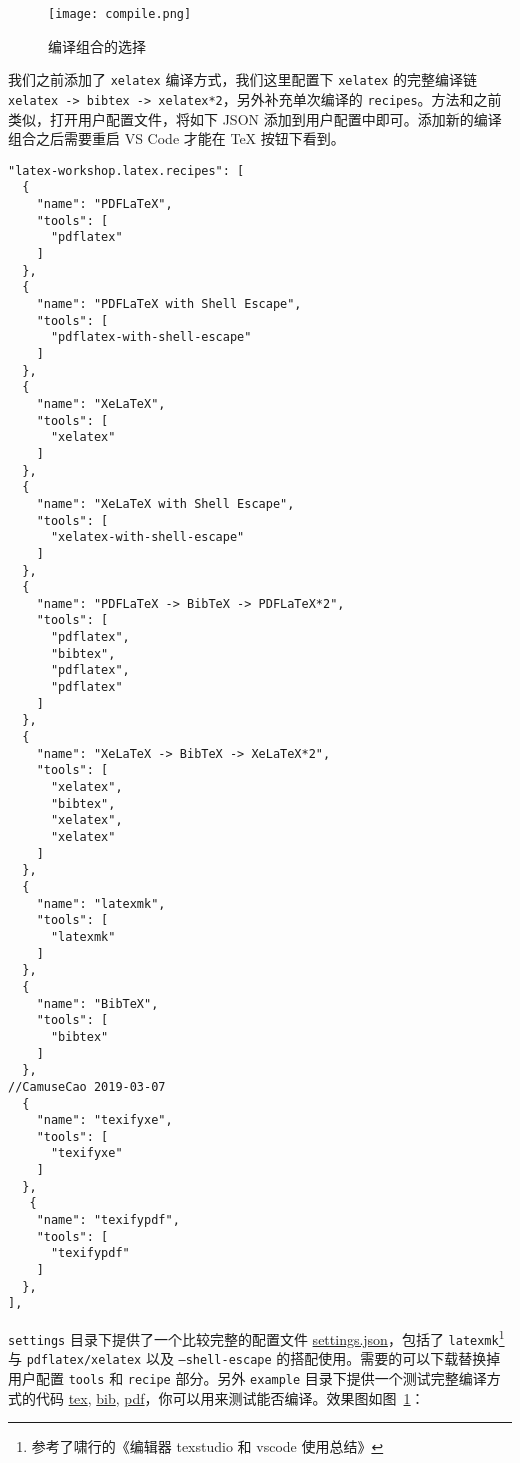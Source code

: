 \documentclass{article}
\begin{document}
\begin{figure}[htbp]
  \centering
  \texttt{[image: compile.png]}
  \caption{编译组合的选择}
  \label{fig:example}
\end{figure}


我们之前添加了 \texttt{xelatex} 编译方式，我们这里配置下 \texttt{xelatex} 的完整编译链 \texttt{xelatex -> bibtex -> xelatex*2}，另外补充单次编译的 \texttt{recipes}。方法和之前类似，打开用户配置文件，将如下 JSON 添加到用户配置中即可。添加新的编译组合之后需要重启 VS Code 才能在 \TeX{} 按钮下看到。


\begin{verbatim}
"latex-workshop.latex.recipes": [
  {
    "name": "PDFLaTeX",
    "tools": [
      "pdflatex"
    ]
  },
  {
    "name": "PDFLaTeX with Shell Escape",
    "tools": [
      "pdflatex-with-shell-escape"
    ]
  },
  {
    "name": "XeLaTeX",
    "tools": [
      "xelatex"
    ]
  },
  {
    "name": "XeLaTeX with Shell Escape",
    "tools": [
      "xelatex-with-shell-escape"
    ]
  },
  {
    "name": "PDFLaTeX -> BibTeX -> PDFLaTeX*2",
    "tools": [
      "pdflatex",
      "bibtex",
      "pdflatex",
      "pdflatex"
    ]
  },
  {
    "name": "XeLaTeX -> BibTeX -> XeLaTeX*2",
    "tools": [
      "xelatex",
      "bibtex",
      "xelatex",
      "xelatex"
    ]
  },
  {
    "name": "latexmk",
    "tools": [
      "latexmk"
    ]
  },
  {
    "name": "BibTeX",
    "tools": [
      "bibtex"
    ]
  },
//CamuseCao 2019-03-07
  {
    "name": "texifyxe",
    "tools": [
      "texifyxe"
    ]
  },
   {
    "name": "texifypdf",
    "tools": [
      "texifypdf"
    ]
  },
],
\end{verbatim}

\texttt{settings} 目录下提供了一个比较完整的配置文件 \href{https://github.com/EthanDeng/vscode-latex/blob/master/settings/settings.json}{settings.json}，包括了 \texttt{latexmk}\footnote{参考了啸行的《编辑器 texstudio 和 vscode 使用总结》} 与 \texttt{pdflatex/xelatex} 以及 \texttt{--shell-escape} 的搭配使用。需要的可以下载替换掉用户配置 \texttt{tools} 和 \texttt{recipe} 部分。另外 \texttt{example} 目录下提供一个测试完整编译方式的代码 \href{https://github.com/EthanDeng/vscode-latex/blob/master/example/content.tex}{tex}, \href{https://github.com/EthanDeng/vscode-latex/blob/master/example/info.bib}{bib}, \href{https://github.com/EthanDeng/vscode-latex/blob/master/example/content.pdf}{pdf}，你可以用来测试能否编译。效果图如图~\ref{fig:example}：
\end{document}
